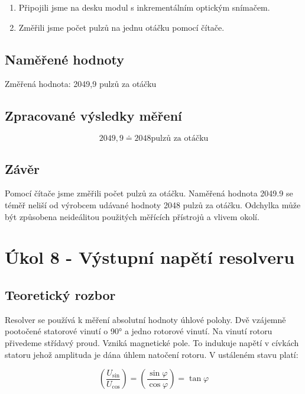 \documentclass{protokol}
\begin{document}
    \begin{enumerate}
        \item Připojili jsme na desku modul s inkrementálním optickým snímačem.
        \item Změřili jsme počet pulzů na jednu otáčku pomocí čítače.
    \end{enumerate}

    \subsection{Naměřené hodnoty}

    \noindent Změřená hodnota: 2049,9 pulzů za otáčku

    \subsection{Zpracované výsledky měření}
        \begin{equation} \label{rov:neco}
        2049,9 \doteq 2048 \text{pulzů za otáčku}
    \end{equation} 
            

    \subsection{Závěr}
    \noindent Pomocí čítače jsme změřili počet pulzů za otáčku. Naměřená hodnota 2049.9 se téměř neliší od výrobcem udávané hodnoty 2048 pulzů za otáčku. Odchylka může být způsobena neideálitou použitých měřících přístrojů a vlivem okolí.


\pagebreak
\section{Úkol 8 - Výstupní napětí resolveru}
    \subsection{Teoretický rozbor}
    \noindent Resolver se používá k měření absolutní hodnoty úhlové polohy. Dvě vzájemně pootočené statorové vinutí o 90° a jedno rotorové vinutí\cite{navod}. Na vinutí rotoru přivedeme střídavý proud. Vzniká magnetické pole. To indukuje napětí v cívkách statoru jehož amplituda je dána úhlem natočení rotoru. V ustáleném stavu platí:

    \begin{equation} \label{rov:pythagor}
        \left( \dfrac{U_{\sin}}{U_{\cos}} \right) = \left(\dfrac{\sin{\varphi}}{\cos{\varphi}} \right) = \tan{\varphi}
    \end{equation} 
\end{document}
